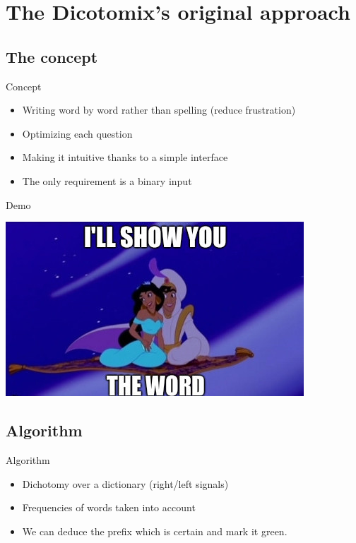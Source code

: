 \documentclass[graphics]{beamer}
\begin{document}
\section{The Dicotomix's original approach}
\subsection{The concept}

\begin{frame}{Concept}
	\begin{center}
		\begin{itemize}
			\item Writing word by word rather than spelling (reduce frustration)
			\item Optimizing each question
			\item Making it intuitive thanks to a simple interface
			\item The only requirement is a binary input
		\end{itemize}
	\end{center}
\end{frame}

\begin{frame}{Demo}
	\begin{center}
		\includegraphics[scale=0.6]{aladdin}
	\end{center}
\end{frame}

\subsection{Algorithm}

\begin{frame}{Algorithm}
	\begin{center}
		\begin{itemize}
			\item Dichotomy over a dictionary (right/left signals)
			\item Frequencies of words taken into account
			\item We can deduce the prefix which is certain and mark it green.
		\end{itemize}
	\end{center}
\end{frame}
\end{document}
